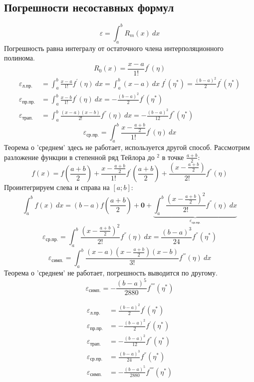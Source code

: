 \documentclass[a4paper,11pt]{article}
\begin{document}
  \subsection{Погрешности несоставных формул}
  \[\varepsilon = \int_a^b R_m(x)\ dx\]
  Погрешность равна интегралу от остаточного члена интерполяционного полинома.
  \[R_0(x) = \frac{x-a}{1!}f^{'}(\eta)\]
  \begin{align*}
    \varepsilon_{\text{л.пр.}}  &= \int_a^b \frac{x-a}{1!} f^{'}(\eta)\ dx = \int_a^b (x-a)\ dx\ f^{'}(\eta^*) = \frac{(b-a)^2}{2}f^{'}(\eta^*) \\
    \varepsilon_{\text{пр.пр.}} &= \int_a^b \frac{x-b}{1!} f^{'}(\eta)\ dx = - \frac{(b-a)^2}{2}f^{'}(\eta^*) \\
    \varepsilon_{\text{трап.}}  &= \int_a^b \frac{(x-a)(x-b)}{2!} f^{''}(\eta)\ dx = - \frac{(b-a)^2}{12}f^{''}(\eta^*)
  \end{align*}
  \[\varepsilon_{\text{ср.пр.}} = \int_a^b \frac{x-\frac{a+b}{2}}{1!} f^{'}(\eta)\ dx\]
  Теорема о 'среднем' здесь не работает, используется другой способ.
  Рассмотрим разложение функции в степенной ряд Тейлора до $^2$  в точке $\frac{a+b}{2}$:
  \[f(x) = f(\frac{a+b}{2}) + \frac{x-\frac{a+b}{2}}{1!} f^{'}(\frac{a+b}{2}) + \frac{(x-\frac{a+b}{2})}{2!} f^{''}(\eta)\]
  Проинтегрируем слева и справа на $[a; b]$:
  \[\int_a^b f(x)\ dx = (b-a)f(\frac{a+b}{2}) + \textbf{0} + \underbrace{\int_a^b \frac{(x-\frac{a+b}{2})^2}{2!} f^{''}(\eta)\ dx}_{\varepsilon_{\text{ср.пр.}}}\]
  \[\varepsilon_{\text{ср.пр.}} = \int_a^b \frac{(x-\frac{a+b}{2})^2}{2!} f^{''}(\eta)\ dx = \frac{(b-a)^3}{24}f^{''}(\eta^*)\]
  \[\varepsilon_{\text{симп.}} = \int_a^b \frac{(x-a)(x-\frac{a+b}{2})(x-b)}{3!} f^{'''}(\eta)\ dx\]
  Теорема о 'среднем' не работает, погрешность выводится по другому.
  \[\varepsilon_{\text{симп.}} = - \frac{(b-a)^5}{2880} f^{''''}(\eta^*)\]
  \begin{importantblock}
    \begin{align*}
      \varepsilon_{\text{л.пр.}}  &= \frac{(b-a)^2}{2}f^{'}(\eta^*) \\
      \varepsilon_{\text{пр.пр.}} &= - \frac{(b-a)^2}{2}f^{'}(\eta^*) \\
      \varepsilon_{\text{трап.}}  &= - \frac{(b-a)^2}{12}f^{''}(\eta^*) \\
      \varepsilon_{\text{ср.пр.}} &= \frac{(b-a)^3}{24}f^{''}(\eta^*) \\
      \varepsilon_{\text{симп.}}  &= - \frac{(b-a)^5}{2880} f^{''''}(\eta^*)
    \end{align*}
  \end{importantblock}
\end{document}
